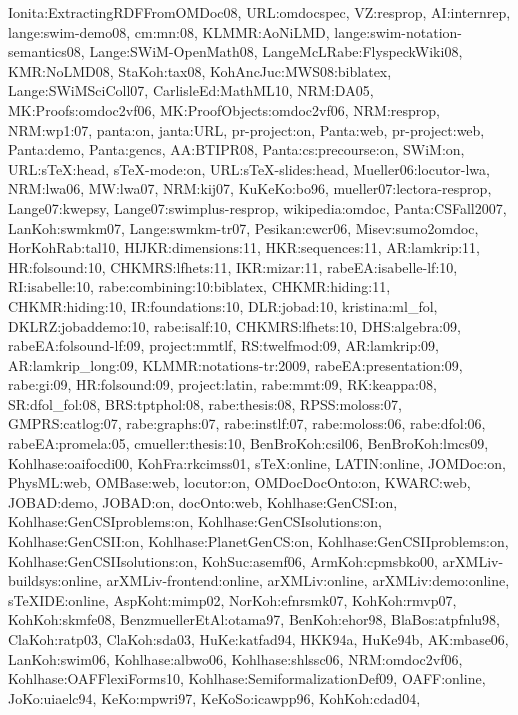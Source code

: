 {Ionita:ExtractingRDFFromOMDoc08,%
URL:omdocspec,%
VZ:resprop,%
AI:internrep,%
lange:swim-demo08,%
cm:mn:08,%
KLMMR:AoNiLMD,%
lange:swim-notation-semantics08,%
Lange:SWiM-OpenMath08,%
LangeMcLRabe:FlyspeckWiki08,%
KMR:NoLMD08,%
StaKoh:tax08,%
KohAncJuc:MWS08:biblatex,%
Lange:SWiMSciColl07,%
CarlisleEd:MathML10,%
NRM:DA05,%
MK:Proofs:omdoc2vf06,%
MK:ProofObjects:omdoc2vf06,%
NRM:resprop,%
NRM:wp1:07,%
panta:on,%
janta:URL,%
pr-project:on,%
Panta:web,%
pr-project:web,%
Panta:demo,%
Panta:gencs,%
AA:BTIPR08,%
Panta:cs:precourse:on,%
SWiM:on,%
URL:sTeX:head,%
sTeX-mode:on,%
URL:sTeX-slides:head,%
Mueller06:locutor-lwa,%
NRM:lwa06,%
MW:lwa07,%
NRM:kij07,%
KuKeKo:bo96,%
mueller07:lectora-resprop,%
Lange07:kwepsy,%
Lange07:swimplus-resprop,%
wikipedia:omdoc,%
Panta:CSFall2007,%
LanKoh:swmkm07,%
Lange:swmkm-tr07,%
Pesikan:cwcr06,%
Misev:sumo2omdoc,%
HorKohRab:tal10,%
HIJKR:dimensions:11,%
HKR:sequences:11,%
AR:lamkrip:11,%
HR:folsound:10,%
CHKMRS:lfhets:11,%
IKR:mizar:11,%
rabeEA:isabelle-lf:10,%
RI:isabelle:10,%
rabe:combining:10:biblatex,%
CHKMR:hiding:11,%
CHKMR:hiding:10,%
IR:foundations:10,%
DLR:jobad:10,%
kristina:ml_fol,%
DKLRZ:jobaddemo:10,%
rabe:isalf:10,%
CHKMRS:lfhets:10,%
DHS:algebra:09,%
rabeEA:folsound-lf:09,%
project:mmtlf,%
RS:twelfmod:09,%
AR:lamkrip:09,%
AR:lamkrip_long:09,%
KLMMR:notations-tr:2009,%
rabeEA:presentation:09,%
rabe:gi:09,%
HR:folsound:09,%
project:latin,%
rabe:mmt:09,%
RK:keappa:08,%
SR:dfol_fol:08,%
BRS:tptphol:08,%
rabe:thesis:08,%
RPSS:moloss:07,%
GMPRS:catlog:07,%
rabe:graphs:07,%
rabe:instlf:07,%
rabe:moloss:06,%
rabe:dfol:06,%
rabeEA:promela:05,%
cmueller:thesis:10,%
BenBroKoh:csil06,%
BenBroKoh:lmcs09,%
Kohlhase:oaifocdi00,%
KohFra:rkcimss01,%
sTeX:online,%
LATIN:online,%
JOMDoc:on,%
PhysML:web,%
OMBase:web,%
locutor:on,%
OMDocDocOnto:on,%
KWARC:web,%
JOBAD:demo,%
JOBAD:on,%
docOnto:web,%
Kohlhase:GenCSI:on,%
Kohlhase:GenCSIproblems:on,%
Kohlhase:GenCSIsolutions:on,%
Kohlhase:GenCSII:on,%
Kohlhase:PlanetGenCS:on,%
Kohlhase:GenCSIIproblems:on,%
Kohlhase:GenCSIIsolutions:on,%
KohSuc:asemf06,%
ArmKoh:cpmsbko00,%
arXMLiv-buildsys:online,%
arXMLiv-frontend:online,%
arXMLiv:online,%
arXMLiv:demo:online,%
sTeXIDE:online,%
AspKoht:mimp02,%
NorKoh:efnrsmk07,%
KohKoh:rmvp07,%
KohKoh:skmfe08,%
BenzmuellerEtAl:otama97,%
BenKoh:ehor98,%
BlaBos:atpfnlu98,%
ClaKoh:ratp03,%
ClaKoh:sda03,%
HuKe:katfad94,%
HKK94a,%
HuKe94b,%
AK:mbase06,%
LanKoh:swim06,%
Kohlhase:albwo06,%
Kohlhase:shlssc06,%
NRM:omdoc2vf06,%
Kohlhase:OAFFlexiForms10,%
Kohlhase:SemiformalizationDef09,%
OAFF:online,%
JoKo:uiaelc94,%
KeKo:mpwri97,%
KeKoSo:icawpp96,%
KohKoh:cdad04,%
}
